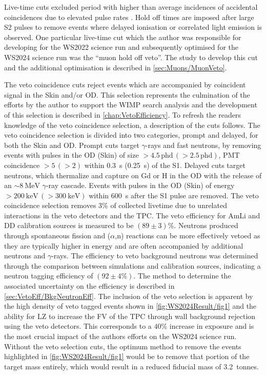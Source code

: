 Live-time cuts excluded period with higher than average incidences of accidental coincidences due to elevated pulse rates \cite{LZCollaboration:2024lux}. Hold off times are imposed after large S2 pulses to remove events where delayed ionisation or correlated light emission is observed. One particular live-time cut which the author was responsible for developing for the WS2022 science run \cite{LZ:2022lsv} and subsequently optimised for the WS2024 science run was the ``muon hold off veto''. The study to develop this cut and the additional optimisation is described in \autoref{sec:Muons/MuonVeto}.

The veto coincidence cuts reject events which are accompanied by coincident signal in the Skin and/or OD. This selection represents the culmination of the efforts by the author to support the WIMP search analysis and the development of this selection is described in \autoref{chap:VetoEfficiency}. To refresh the readers knowledge of the veto coincidence selection, a description of the cuts follows. 
The veto coincidence selection is divided into two categories, prompt and delayed, for both the Skin and OD. Prompt cuts target $\gamma$-rays and fast neutrons, by removing events with pulses in the OD (Skin) of size $>4.5\,\text{phd}\,(>2.5\,\text{phd})$, PMT coincidence $>5\,(>2)$ within 0.3~\textmu s (0.25~\textmu s) of the S1. Delayed cuts target neutrons, which thermalize and capture on Gd or H in the OD with the release of an $\sim8~\text{MeV}$ $\gamma$-ray cascade. Events with pulses in the OD (Skin) of energy $>200~\text{keV}\,(>300~\text{keV})$ within 600~\textmu s after the S1 pulse are removed. The veto coincidence selection removes $3\%$ of collected livetime due to unrelated interactions in the veto detectors and the TPC. The veto efficiency for AmLi and DD calibration sources is measured to be $(89\pm3)\%$. Neutrons produced through spontaneous fission and ($\alpha$,n) reactions can be more effectively vetoed as they are typically higher in energy and are often accompanied by additional neutrons and $\gamma$-rays. The efficiency to veto background neutrons was determined through the comparison between simulations and calibration sources, indicating a neutron tagging efficiency of  $(92\pm4\%)$. The method to determine the associated uncertainty on the efficiency is described in \autoref{sec:VetoEff/BkgNeutronEff}.
The inclusion of the veto selection is apparent by the high density of veto tagged events shown in \autoref{fig:WS2024Result/fig1} and the ability for LZ to increase the FV of the TPC through wall background rejection using the veto detectors. This corresponds to a $40\%$ increase in exposure and is the most crucial impact of the authors efforts on the WS2024 science run. Without the veto selection cuts, the optimum method to remove the events highlighted in \autoref{fig:WS2024Result/fig1} would be to remove that portion of the target mass entirely, which would result in a reduced fiducial mass of 3.2~tonnes.

